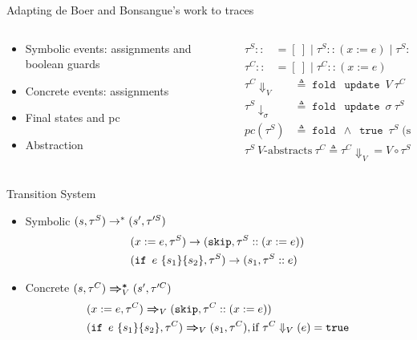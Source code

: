 \documentclass{beamer}
\DeclareMathOperator{\ifs}{\mathtt{if}}
\DeclareMathOperator{\skips}{\mathtt{skip}}
\DeclareMathOperator{\fold}{\mathtt{fold}}
\DeclareMathOperator{\update}{\mathtt{update}}
\DeclareMathOperator{\true}{\mathtt{true}}
\newcommand{\pc}[1]{\ensuremath{pc(#1)}}
\newcommand{\accC}[2][V_0]{\ensuremath{#2\Downarrow_{#1}}}
\newcommand{\accS}[2][]{\ensuremath{#2\downarrow_{#1}}}
\begin{document}
\begin{frame}{Adapting de Boer and Bonsangue's work to traces}
  \begin{columns}
    \begin{column}{.5\textwidth}
      \begin{itemize}
        \item Symbolic events: assignments and boolean guards
        \item Concrete events: assignments
        \item Final states and pc
        \item Abstraction
      \end{itemize}
    \end{column}
    \begin{column}{.5\textwidth}
      \begin{align*}
        \tau^{S} ::&= [~] \mid \tau^{S} :: (x := e) \mid \tau^{S} :: e\\
        \tau^{C} ::&= [~] \mid \tau^{C} :: (x := e)
      \end{align*}
      \begin{align*}
        \accC[V]{\tau^{C}} &\triangleq \fold~\update~V~\tau^{C}\\
        \accS[\sigma]{\tau^{S}} &\triangleq \fold~\update~\sigma~\tau^{S}\\
        \pc{\tau^{S}} &\triangleq \fold~\land~\true~\tau^{S} \; \text{(sort of)}
      \end{align*}
      \begin{align*}
        \tau^{S}~V\text{-abstracts}~\tau^{C} \triangleq \accC[V]{\tau^{C}} = V \circ \accS[id]{\tau^{S}}
      \end{align*}
    \end{column}
  \end{columns}
\end{frame}

\begin{frame}{Transition System}
  \begin{itemize}
    \item Symbolic $\Sstar{(s, \tau^{S})}{(s', \tau'^{S})}$
          \begin{align*}
            &\Sstep{(x := e, \tau^{S})}{(\skips, \tau^{S} :: (x :=  e))}\\
            &\Sstep{(\ifs~e~\{s_{1}\}\{s_{2}\}, \tau^{S})}{(s_{1}, \tau^{S} :: e)}\\
          \end{align*}
    \item Concrete $\Cstar[V]{(s, \tau^{C})}{(s', \tau'^{C})}$
          \begin{align*}
            &\Cstep[V]{(x := e, \tau^{C})}{(\skips, \tau^{C} :: (x := e))}\\
            &\Cstep[V]{(\ifs~e~\{s_{1}\}\{s_{2}\}, \tau^{C})}{(s_{1}, \tau^{C})}, \text{if } \accC[V]{\tau^C} (e) = \true
          \end{align*}
  \end{itemize}
\end{frame}
\end{document}
